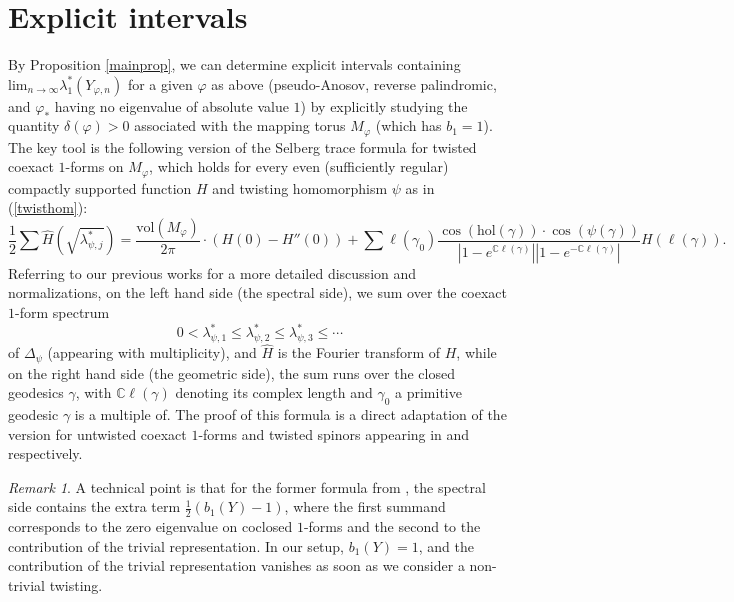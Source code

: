 \documentclass[11pt]{amsart}
\theoremstyle{definition}
\theoremstyle{remark}
\newtheorem{remark}{Remark}[section]
\begin{document}
\section{Explicit intervals}
By Proposition \ref{mainprop}, we can determine explicit intervals containing $\mathrm{lim}_{n\rightarrow\infty}\lambda_1^*(Y_{\varphi,n})$ for a given $\varphi$ as above (pseudo-Anosov, reverse palindromic, and $\varphi_*$ having no eigenvalue of absolute value $1$) by explicitly studying the quantity $\delta(\varphi)>0$ associated with the mapping torus $M_\varphi$ (which has $b_1=1$). The key tool is the following version of the Selberg trace formula for twisted coexact $1$-forms on $M_\varphi$, which holds for every even (sufficiently regular) compactly supported function $H$ and twisting homomorphism $\psi$ as in (\ref{twisthom}):
\begin{equation}\label{selberg}
\frac{1}{2}\sum \widehat{H}\left(\sqrt{\lambda^*_{\psi,j}}\right)=\frac{\mathrm{vol}(M_\varphi)}{2\pi} \cdot (H(0)-H''(0))+\sum \ell(\gamma_0)\frac{\cos(\mathrm{hol}(\gamma))\cdot\cos(\psi(\gamma))}{|1-e^{\mathbb{C}\ell(\gamma)}||1-e^{-\mathbb{C}\ell(\gamma)}|}H(\ell(\gamma)).
\end{equation}
Referring to our previous works \cite{LL1,LL3} for a more detailed discussion and normalizations, on the left hand side (the spectral side), we sum over the coexact $1$-form spectrum 
\begin{equation*}
0<\lambda_{\psi,1}^*\leq\lambda_{\psi,2}^*\leq\lambda_{\psi,3}^*\leq \cdots
\end{equation*}
of $\Delta_{\psi}$ (appearing with multiplicity), and $\widehat{H}$ is the Fourier transform of $H$, while on the right hand side (the geometric side), the sum runs over the closed geodesics $\gamma$, with $\mathbb{C}\ell(\gamma)$ denoting its complex length and $\gamma_0$ a primitive geodesic $\gamma$ is a multiple of. The proof of this formula is a direct adaptation of the version for untwisted coexact $1$-forms and twisted spinors appearing in \cite{LL1} and \cite{LL3} respectively.
\begin{remark}
A technical point is that for the former formula from \cite{LL1}, the spectral side contains the extra term $\frac{1}{2}(b_1(Y)-1)$, where the first summand corresponds to the zero eigenvalue on coclosed $1$-forms and the second to the contribution of the trivial representation. In our setup, $b_1(Y)=1$, and the contribution of the trivial representation vanishes as soon as we consider a non-trivial twisting.
\end{remark}
\end{document}
